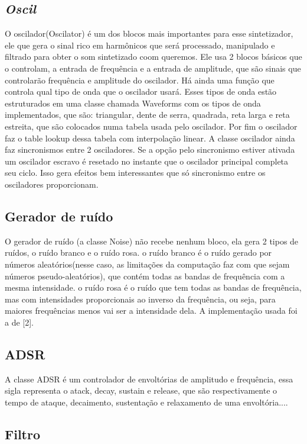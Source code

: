\documentclass{article}
\begin{document}
\subsection{\emph{Oscil}}
O oscilador(Oscilator) é um dos blocos mais importantes para esse sintetizador, ele que gera o sinal rico em harmônicos que será processado, manipulado e filtrado para obter o som sintetizado coom queremos.
Ele usa 2 blocos básicos que o controlam, a entrada de frequência e a entrada de amplitude, que são sinais que controlarão frequência e amplitude do oscilador. 
Há ainda uma função que controla qual tipo de onda que o oscilador usará. Esses tipos de onda estão estruturados em uma classe chamada Waveforms com os tipos de onda implementados, que são: triangular, dente de serra, quadrada, reta larga e reta estreita, que são colocados numa tabela usada pelo oscilador. Por fim o oscilador faz o table lookup dessa tabela  com interpolação linear.
A classe oscilador ainda faz sincronismos entre 2 osciladores. Se a opção pelo sincronismo estiver ativada um oscilador escravo é resetado no instante que o oscilador principal completa seu ciclo. Isso gera efeitos  bem interessantes que só sincronismo entre os osciladores proporcionam.

\subsection{Gerador de ruído}
O gerador de ruído (a classe Noise) não recebe nenhum bloco, ela gera 2 tipos de ruídos, o ruído branco e o ruído rosa.
o ruído branco é o ruído gerado por números aleatórios(nesse caso, as limitações da computação faz com que sejam números pseudo-aleatórios), que contém todas as bandas de frequência com a mesma intensidade.
o ruído rosa é o ruído que tem todas as bandas de frequência, mas com intensidades proporcionais ao inverso da frequência, ou seja, para maiores frequências menos vai ser a intensidade dela. A implementação usada foi a de [2].
\subsection{ADSR}
A classe ADSR é um controlador de envoltórias de amplitudo e frequência, essa sigla representa o atack, decay, sustain e release, que são respectivamente o tempo de ataque, decaimento, sustentação e relaxamento de uma envoltória....
\subsection{Filtro}
\end{document}
